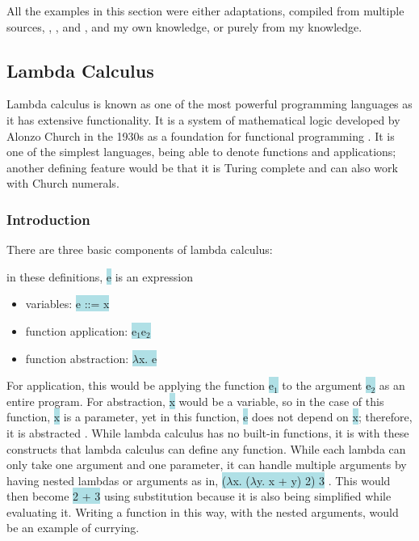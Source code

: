 \documentclass{article}
\begin{document}
\hfill \break

All the examples in this section were either adaptations, compiled from multiple sources, \cite{AUG}, \cite{DAU}, and \cite{PL}, and my own knowledge, or purely from my knowledge. 

\subsection{Lambda Calculus}
Lambda calculus is known as one of the most powerful programming languages as it has extensive functionality. It is a system of mathematical logic developed by Alonzo Church in the 1930s as a foundation for functional programming \cite{LC}. It is one of the simplest languages, being able to denote functions and applications; another defining feature would be that it is Turing complete and can also work with Church numerals. 

\subsubsection{Introduction}

There are three basic components of lambda calculus: 

in these definitions, \colorbox{powderblue}{e} is an expression

\begin{itemize}

\item variables: \colorbox{powderblue}{e ::= x}

\item function application: \colorbox{powderblue}{e$_1$e$_2$}

\item function abstraction: \colorbox{powderblue}{$\lambda$x. e}

\end{itemize}

For application, this would be applying the function \colorbox{powderblue}{e$_1$} to the argument \colorbox{powderblue}{e$_2$} as an entire program. For abstraction, \colorbox{powderblue}{x} would be a variable, so in the case of this function, \colorbox{powderblue}{x} is a parameter, yet in this function, \colorbox{powderblue}{e} does not depend on \colorbox{powderblue}{x}; therefore, it is abstracted \cite{PL}. While lambda calculus has no built-in functions, it is with these constructs that lambda calculus can define any function. While each lambda can only take one argument and one parameter, it can handle multiple arguments by having nested lambdas or arguments as in, \colorbox{powderblue}{($\lambda$x. ($\lambda$y. x + y) 2) 3} \cite{PL}. This would then become \colorbox{powderblue}{2 + 3} using substitution because it is also being simplified while evaluating it. Writing a function in this way, with the nested arguments, would be an example of currying.
\end{document}
